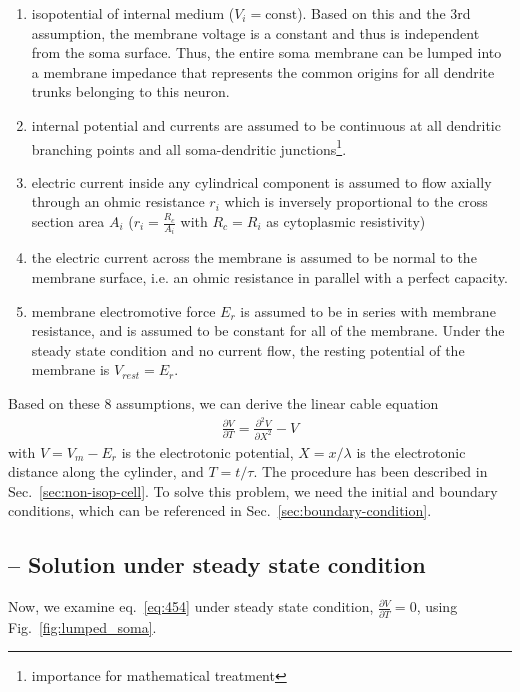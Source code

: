 \begin{enumerate}
\item isopotential of internal medium ($V_i=\text{const}$). Based on
  this and the 3rd assumption, the membrane voltage is a constant and
  thus is independent from the soma surface. Thus, the entire soma
  membrane can be lumped into a membrane impedance that represents the
  common origins for all dendrite trunks belonging to this neuron.

\item internal potential and currents are assumed to be continuous at
  all dendritic branching points and all soma-dendritic
  junctions\footnote{importance for mathematical treatment}.

\item electric current inside any cylindrical component is assumed to
  flow axially through an ohmic resistance $r_i$ which is inversely
  proportional to the cross section area $A_i$ ($r_i=\frac{R_c}{A_i}$
  with $R_c=R_i$ as cytoplasmic resistivity)

\item the electric current across the membrane is assumed to be normal
  to the membrane surface, i.e. an ohmic resistance in parallel with a
  perfect capacity.

\item membrane electromotive force $E_r$ is assumed to be in series
  with membrane resistance, and is assumed to be constant for all of
  the membrane. Under the steady state condition and no current flow,
  the resting potential of the membrane is $V_{rest} = E_r$.
\end{enumerate}

Based on these 8 assumptions, we can derive the linear cable equation
\begin{eqnarray}
  \label{eq:454}
  \frac{\partial V}{\partial T}  = \frac{\partial^2V}{\partial X^2} - V
\end{eqnarray}
with $V=V_m-E_r$ is the electrotonic potential, $X=x/\lambda$ is the
electrotonic distance along the cylinder, and $T=t/\tau$. The
procedure has been described in Sec.~\ref{sec:non-isop-cell}. To solve
this problem, we need the initial and boundary conditions, which can
be referenced in Sec.~\ref{sec:boundary-condition}.

\subsection{-- Solution under steady state condition}
\label{sec:solut-under-steady}

Now, we examine eq.~\eqref{eq:454} under steady state condition,
$\frac{\partial V}{\partial T} = 0$, using Fig.~\ref{fig:lumped_soma}.

